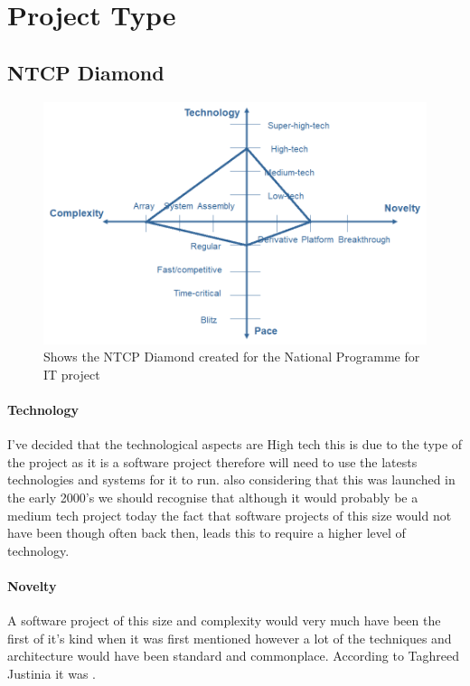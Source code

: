 \documentclass[a4paper,12pt]{scrartcl}
\begin{document}
	\section{Project Type}
	{
		\subsection{NTCP Diamond}
		{
			\begin{figure}[h]
				\centering
				\includegraphics[width=\textwidth]{NationalProgrammeForITNTCP.png}
				\caption{Shows the NTCP Diamond created for the National Programme for IT project}
				\label{fig:NTCPDigram}
			\end{figure}
			\paragraph{Technology}
			{
				I've decided that the technological aspects are High tech this is due to the type of the project as it is a software project therefore will need to use the latests technologies and systems for it to run. also considering that this was launched in the early 2000's we should recognise that although it would probably be a medium tech project today the fact that software projects of this size would not have been though often back then, leads this to require a higher level of technology.
			}
			\paragraph{Novelty}
			{
				A software project of this size and complexity would very much have been the first of it's kind when it was first mentioned however a lot of the techniques and architecture would have been standard and commonplace. According to Taghreed Justinia it was \cite{Justinia2016}. 
			}
}}
\end{document}

